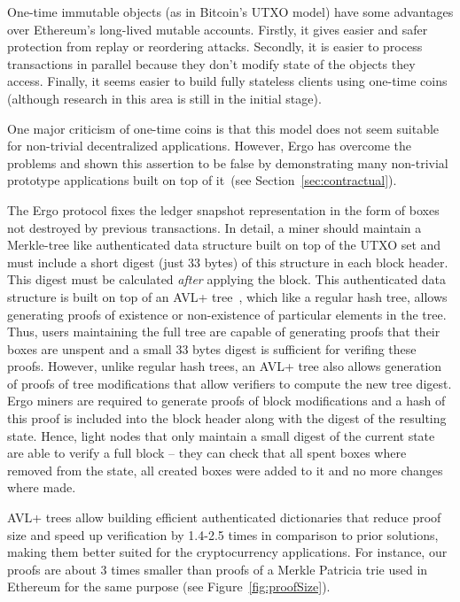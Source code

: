 
One-time immutable objects (as in Bitcoin's UTXO model) have some advantages over Ethereum's long-lived mutable accounts. Firstly, it gives easier and safer protection from replay or reordering attacks. Secondly, it is easier to process transactions in parallel because they don't modify state of the objects they access. Finally, it seems easier to build fully stateless clients using one-time coins~\cite{chepurnoy2018edrax} (although research in this area is still in the initial stage).

One major criticism of one-time coins is that this model does not seem suitable for non-trivial decentralized applications. However, Ergo has overcome the problems and shown this assertion to be false by
demonstrating many non-trivial prototype applications built on top of
it~(see Section~\ref{sec:contractual}).

The Ergo protocol fixes the ledger snapshot representation in the form of boxes not destroyed by previous transactions.
In detail, a miner should maintain a Merkle-tree like authenticated data structure built on top of the UTXO set and must include a short digest (just 33 bytes) of this structure in each block header. This digest must be calculated {\em after} applying the block.
This authenticated data structure is built on top of an AVL+ tree~\cite{reyzin2017improving}, which like a regular hash tree,
allows generating proofs of existence or non-existence of particular elements in the tree.
Thus, users maintaining the full tree are capable of generating proofs that their boxes are unspent and a small 33 bytes digest is sufficient for verifing these proofs.
However, unlike regular hash trees, an AVL+ tree also allows generation of proofs of tree modifications that allow verifiers to compute the new tree digest.
Ergo miners are required to generate proofs of block modifications and a hash of this proof is included into the block header along with the digest of the resulting state.
Hence, light nodes that only maintain a small digest of the current state are able to verify a full block -- they can check that all spent boxes where
removed from the state, all created boxes were added to it and no more changes where made. 

AVL+ trees allow building efficient authenticated dictionaries that reduce proof size and speed up verification by 1.4-2.5 times in comparison to prior solutions, making them better suited for the cryptocurrency applications.
For instance, our proofs are about 3 times smaller than proofs of a Merkle Patricia trie used in Ethereum for the same purpose (see Figure~\ref{fig:proofSize}).

